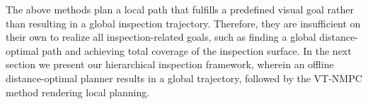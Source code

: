 
The above methods plan a local path that fulfills a predefined visual goal rather than resulting in a global inspection trajectory. Therefore, they are insufficient on their own to realize all inspection-related goals, such as finding a global distance-optimal path and achieving total coverage of the inspection surface. In the next section we present our hierarchical inspection framework, wherein an offline distance-optimal planner results in a global trajectory, followed by the VT-NMPC method rendering local planning. %
